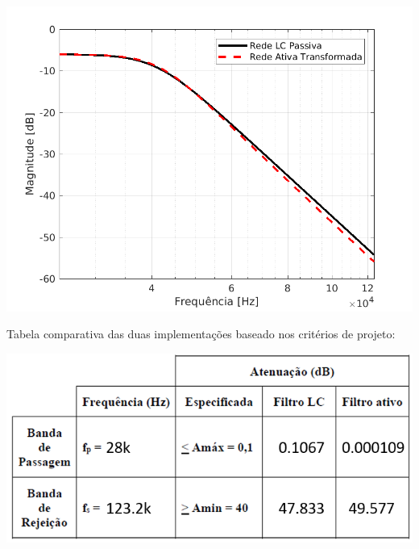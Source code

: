 \documentclass{article}
\begin{document}
\begin{center}
\centering
  \includegraphics[scale=0.7]{img/magnitudebandstop.png}
\end{center}

Tabela comparativa das duas implementações baseado nos critérios de projeto:
\begin{center}
\centering
  \includegraphics[scale=0.5]{img/tabelapreeenchida.png}
\end{center}
\end{document}
